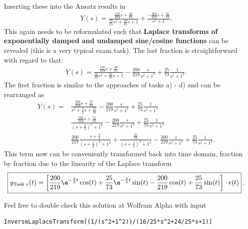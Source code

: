 %
Inserting these into the Ansatz results in
\begin{align}
Y(s) = \frac{\frac{128}{219} s +
\frac{48}{73}}{\frac{16}{25} s^2 +
\frac{24}{25} s + 1} +
\frac{-\frac{200}{219} s +
\frac{25}{73}}{s^2+1}.
\end{align}
This again needs to be reformulated such that \textbf{Laplace transforms of
exponentially damped and undamped sine/cosine functions}
can be revealed (this is a very typical exam task).
%
The last fraction is straightforward with regard to that:
\begin{align}
Y(s) = \frac{\frac{128}{219} s + \frac{48}{73}}{\frac{16}{25} s^2 + \frac{24}{25} s + 1}
-\frac{200}{219}\frac{s}{s^2+1^2}
+\frac{25}{73}\frac{1}{s^2+1^2}.
\end{align}
%
The first fraction is similar to the approaches of tasks a) - d) and can be
rearranged as
\begin{align}
Y(s) = &
\frac{\frac{200}{219} s + \frac{75}{73}}{s^2 + \frac{3}{2} s + \frac{25}{16}}
-\frac{200}{219}\frac{s}{s^2+1^2}
+\frac{25}{73}\frac{1}{s^2+1^2}\\
&
\frac{\frac{200}{219} s + \frac{75}{73}}{(s + \frac{3}{4})^2 + 1^2}
-\frac{200}{219}\frac{s}{s^2+1^2}
+\frac{25}{73}\frac{1}{s^2+1^2}\\
&
\frac{200}{219} \frac{s + \frac{3}{4}}{(s + \frac{3}{4})^2 + 1^2}+
\frac{\frac{25}{73}}{(s + \frac{3}{4})^2 + 1^2}
-\frac{200}{219}\frac{s}{s^2+1^2}
+\frac{25}{73}\frac{1}{s^2+1^2}.
\end{align}
This term now can be conveniently transformed back into time domain,
fraction by fraction due to the linearity of the Laplace transform
\begin{align}
\boxed{
  y_\text{Task e}(t) =
  \left[ \frac{200}{219} \e^{-\frac{3}{4} t} \cos(t) +
  \frac{25}{73} \e^{-\frac{3}{4} t} \sin(t) -
  \frac{200}{219} \cos(t) +
  \frac{25}{73} \sin(t) \right] \cdot \epsilon(t)}\,.
\end{align}

Feel free to double check this solution at Wolfram Alpha with input
\begin{verbatim}
InverseLaplaceTransform[(1/(s^2+1^2))/(16/25*s^2+24/25*s+1)]
\end{verbatim}



